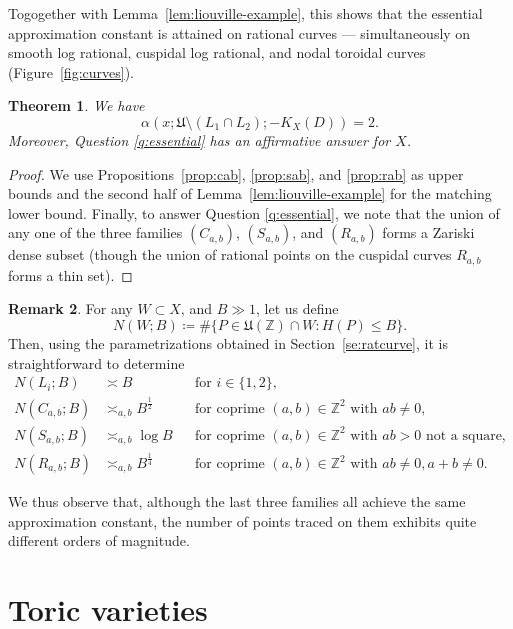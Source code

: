 \documentclass[a4paper, twoside, 11pt]{amsart}
\newtheorem{theorem}{Theorem}[section]
\theoremstyle{definition}
\newtheorem{remark}[theorem]{Remark}
\newcommand{\mU}{\mathfrak{U}}
\newcommand{\ZZ}{\mathbb{Z}}
\begin{document}
Togogether with Lemma~\ref{lem:liouville-example}, this shows that the essential approximation constant is attained on rational curves --- simultaneously on smooth log rational, cuspidal log rational, and nodal toroidal curves (Figure~\ref{fig:curves}).

\begin{theorem}
We have $$\alpha(x;\mU \setminus (L_1\cap L_2);-K_X(D))=2.$$
    Moreover, Question \ref{q:essential} has an affirmative answer for $X$.
\end{theorem}
\begin{proof}
 We use Propositions~\ref{prop:cab}, \ref{prop:sab}, and \ref{prop:rab} as upper bounds and the second half of Lemma~\ref{lem:liouville-example} for the matching lower bound.
    Finally, to answer Question \ref{q:essential}, we note that the union of any one of the three families $(C_{a,b})$, $(S_{a,b})$, and $(R_{a,b})$ forms a Zariski dense subset (though the union of rational points on the cuspidal curves $R_{a,b}$ forms a thin set).
\end{proof}

\begin{remark}
For any $W\subset X$, and $B\gg 1$, let us define 
$$N(W;B)\coloneq \#\{P\in\mU(\ZZ)\cap W:H(P)\leq B\}.$$
Then, using the parametrizations obtained in Section~\ref{se:ratcurve}, it is straightforward to determine
\begin{align*}
N(L_i;B)    &\asymp B && \text{for $i\in \{1,2\}$,}\\
N(C_{a,b};B)&\asymp_{a,b} B^\frac{1}{2} && \text{for coprime $(a,b)\in \ZZ^2$ with $ab\ne 0$,}\\
N(S_{a,b};B)&\asymp_{a,b} \log B&&\text{for coprime $(a,b)\in \ZZ^2$ with $ab>0$ not a square,}\\
 N(R_{a,b};B)&\asymp_{a,b} B^{\frac{1}{4}} && \text{for coprime $(a,b)\in \ZZ^2$ with $ab\neq0,a+b\ne 0$.}
\end{align*}

We thus observe that, although the last three families all achieve the same approximation constant, the number of points traced on them exhibits quite different orders of magnitude.
\end{remark}



\section{Toric varieties}\label{se:toric}
\end{document}
